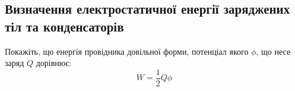 
\subsection*{Визначення електростатичної енергії заряджених тіл та конденсаторів}

\begin{problem}
    Покажіть, що енергія провідника довільної форми, потенціал якого $\phi$, що несе заряд $Q$ дорівнює:
	\begin{equation*}
		W = \frac{1}{2}Q\phi
	\end{equation*}
\end{problem}

